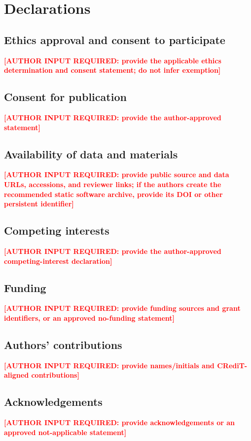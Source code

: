 \documentclass[pdflatex,sn-vancouver-num,referee,lineno]{sn-jnl}
\newcommand{\PendingAuthor}[1]{\textcolor{red}{\textbf{[AUTHOR INPUT REQUIRED: #1]}}}
\begin{document}
\section*{Declarations}

\subsection*{Ethics approval and consent to participate}
\PendingAuthor{provide the applicable ethics determination and consent statement; do not infer exemption}

\subsection*{Consent for publication}
\PendingAuthor{provide the author-approved statement}

\subsection*{Availability of data and materials}
\PendingAuthor{provide public source and data URLs, accessions, and reviewer links; if the authors create the recommended static software archive, provide its DOI or other persistent identifier}

\subsection*{Competing interests}
\PendingAuthor{provide the author-approved competing-interest declaration}

\subsection*{Funding}
\PendingAuthor{provide funding sources and grant identifiers, or an approved no-funding statement}

\subsection*{Authors' contributions}
\PendingAuthor{provide names/initials and CRediT-aligned contributions}

\subsection*{Acknowledgements}
\PendingAuthor{provide acknowledgements or an approved not-applicable statement}


\end{document}
